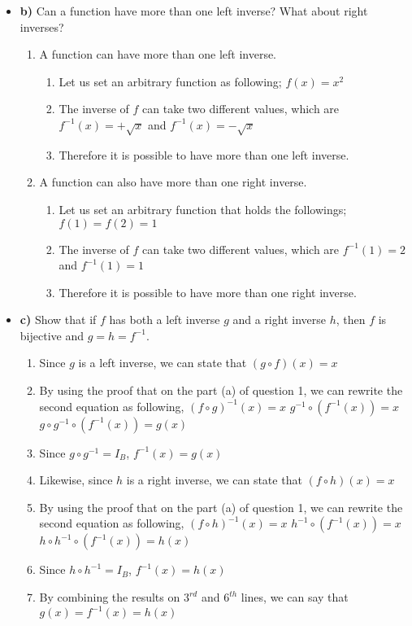 \documentclass[12pt]{article}
\begin{document}
\begin{itemize}
    \item  \textbf{b)} Can a function have more than one left inverse? What about right inverses?
    \begin{enumerate}
        \item A function can have more than one left inverse.
        \begin{enumerate}
        \item Let us set an arbitrary function as following;
        \subitem $f(x)=x^2$
        \item The inverse of $f$ can take two different values, which are 
        \subitem $f^{-1}(x)=+\sqrt x$ and
        \subitem $f^{-1}(x)=-\sqrt x$
        \item Therefore it is possible to have more than one left inverse.
        \end{enumerate}
        \item A function can also have more than one right inverse.
        \begin{enumerate}
        \item Let us set an arbitrary function that holds the followings;
        \subitem $f(1)=f(2)=1$
        \item The inverse of $f$ can take two different values, which are 
        \subitem $f^{-1}(1)=2$ and
        \subitem $f^{-1}(1)=1$
        \item Therefore it is possible to have more than one right inverse.
        \end{enumerate}
    \end{enumerate}
    \item  \textbf{c)} Show that if $f$ has both a left inverse $g$ and a right inverse $h$, then $f$ is bijective and $g=h=f^{-1}$.
    \begin{enumerate}
        \item Since $g$ is a left inverse, we can state that
        \subitem $(g \circ f) (x) = x$
        \item By using the proof that on the part (a) of question 1, we can rewrite the second equation as following,
        \subitem $(f \circ g)^{-1}(x)=x$
        \subitem $g^{-1} \circ ( f^{-1}(x))=x$
        \subitem $g\circ g^{-1} \circ ( f^{-1}(x))=g(x)$
        \item Since $g \circ g^{-1} = I_B$,  
        \subitem $ f^{-1}(x)=g(x)$
        
        \item Likewise, since $h$ is a right inverse, we can state that
        \subitem $(f \circ h)(x)=x$
        \item By using the proof that on the part (a) of question 1, we can rewrite the second equation as following,
        \subitem $(f \circ h)^{-1}(x)=x$
        \subitem $h^{-1} \circ ( f^{-1}(x))=x$
        \subitem $h\circ h^{-1} \circ ( f^{-1}(x))=h(x)$
        \item Since $h \circ h^{-1} = I_B$,  
        \subitem $ f^{-1}(x)=h(x)$
        \item By combining the results on $3^{rd}$ and $6^{th}$ lines, we can say that
        \subitem $ g(x) = f^{-1}(x)=h(x)$
        

\end{enumerate}
\end{itemize}
\end{document}
